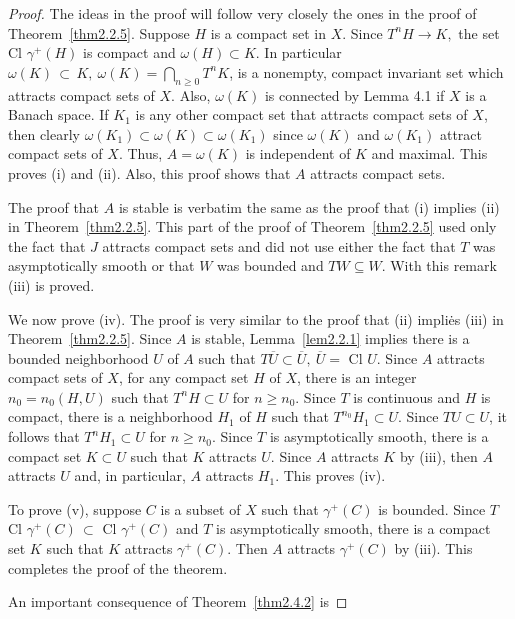 \documentclass{surv-l}
\theoremstyle{plain}
\theoremstyle{definition}
\numberwithin{equation}{section}
\numberwithin{figure}{chapter}
\begin{document}
\begin{proof}
The ideas in the proof will follow very closely the ones in the proof of Theorem~\ref{thm2.2.5}. Suppose $H$ is a compact set in $X$. Since $T^{n}H\rightarrow K,$ the set Cl $\gamma^{+}(H)$ is compact and $\omega(H)\subset K$. In particular $\omega(K) \, \subset \, K,\ \omega(K)= \bigcap_{n\geq0}T^{n}K$, is a nonempty, compact invariant set which attracts compact sets of $X$. Also, $\omega(K)$ is connected by Lemma 4.1 if $X$ is a Banach space. If $K_{1}$ is any other compact set that attracts compact sets of $X$, then clearly $\omega(K_{1})\subset\omega(K)\subset \omega(K_{1})$ since $\omega(K)$ and $\omega(K_{1})$ attract compact sets of $X$. Thus, $A=\omega(K)$ is independent of $K$ and maximal. This proves (i) and (ii). Also, this proof shows that $A$ attracts compact sets.

The proof that $A$ is stable is verbatim the same as the proof that (i) implies (ii) in Theorem~\ref{thm2.2.5}. This part of the proof of Theorem~\ref{thm2.2.5} used only the fact that $J$ attracts compact sets and did not use either the fact that $T$ was asymptotically smooth or that $W$ was bounded and $TW\subseteq W$. With this remark (iii) is proved.

We now prove (iv). The proof is very similar to the proof that (ii) impli\.{e}s (iii) in Theorem~\ref{thm2.2.5}. Since $A$ is stable, Lemma~\ref{lem2.2.1} implies there is a bounded neighborhood $U$ of $A$ such that $T\overline{U}\subset\overline{U},\ \overline{U}=$ Cl $U$. Since $A$ attracts compact sets of $X$, for any compact set $H$ of $X$, there is an integer $n_{0}=n_{0}(H, U)$ such that $T^{n}H\subset U$ for $n\geq n_{0}$. Since $T$ is continuous and $H$ is compact, there is a neighborhood $H_{1}$ of $H$ such that $T^{n_{0}}H_{1}\subset U$. Since $TU\subset U$, it follows that $T^{n}H_{1}\subset U$ for $n\geq n_{0}$. Since $T$ is asymptotically smooth, there is a compact set $K\subset U$ such that $K$ attracts $U$. Since $A$ attracts $K$ by (iii), then $A$ attracts $U$ and, in particular, $A$ attracts $H_{1}$. This proves (iv).

To prove (v), suppose $C$ is a subset of $X$ such that $\gamma^{+}(C)$ is bounded. Since $T$ Cl $\gamma^{+}(C) \, \subset$ Cl $\gamma^{+}(C)$ and $T$ is asymptotically smooth, there is a compact set $K$ such that $K$ attracts $\gamma^{+}(C)$. Then $A$ attracts $\gamma^{+}(C)$ by (iii). This completes the proof of the theorem.

An important consequence of Theorem~\ref{thm2.4.2} is
\end{proof}
\end{document}
